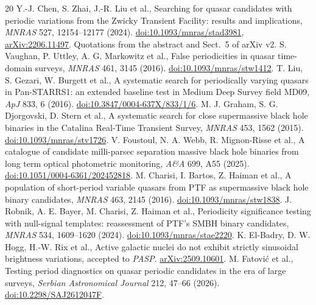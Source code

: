 \documentclass[11pt]{article}
\begin{document}
\begin{thebibliography}{20}
 Y.-J. Chen, S. Zhai, J.-R. Liu et al., Searching for quasar candidates with periodic variations from the Zwicky Transient Facility: results and implications, \emph{MNRAS} 527, 12154--12177 (2024). \href{https://doi.org/10.1093/mnras/stad3981}{doi:10.1093/mnras/stad3981}, \href{https://arxiv.org/abs/2206.11497}{arXiv:2206.11497}. Quotations from the abstract and Sect.~5 of arXiv v2.
 S. Vaughan, P. Uttley, A. G. Markowitz et al., False periodicities in quasar time-domain surveys, \emph{MNRAS} 461, 3145 (2016). \href{https://doi.org/10.1093/mnras/stw1412}{doi:10.1093/mnras/stw1412}.
 T. Liu, S. Gezari, W. Burgett et al., A systematic search for periodically varying quasars in Pan-STARRS1: an extended baseline test in Medium Deep Survey field MD09, \emph{ApJ} 833, 6 (2016). \href{https://doi.org/10.3847/0004-637X/833/1/6}{doi:10.3847/0004-637X/833/1/6}.
 M. J. Graham, S. G. Djorgovski, D. Stern et al., A systematic search for close supermassive black hole binaries in the Catalina Real-Time Transient Survey, \emph{MNRAS} 453, 1562 (2015). \href{https://doi.org/10.1093/mnras/stv1726}{doi:10.1093/mnras/stv1726}.
 V. Foustoul, N. A. Webb, R. Mignon-Risse et al., A catalogue of candidate milli-parsec separation massive black hole binaries from long term optical photometric monitoring, \emph{A\&A} 699, A55 (2025). \href{https://doi.org/10.1051/0004-6361/202452818}{doi:10.1051/0004-6361/202452818}.
 M. Charisi, I. Bartos, Z. Haiman et al., A population of short-period variable quasars from PTF as supermassive black hole binary candidates, \emph{MNRAS} 463, 2145 (2016). \href{https://doi.org/10.1093/mnras/stw1838}{doi:10.1093/mnras/stw1838}.
 J. Robnik, A. E. Bayer, M. Charisi, Z. Haiman et al., Periodicity significance testing with null-signal templates: reassessment of PTF's SMBH binary candidates, \emph{MNRAS} 534, 1609--1620 (2024). \href{https://doi.org/10.1093/mnras/stae2220}{doi:10.1093/mnras/stae2220}.
 K. El-Badry, D. W. Hogg, H.-W. Rix et al., Active galactic nuclei do not exhibit strictly sinusoidal brightness variations, accepted to \emph{PASP}. \href{https://arxiv.org/abs/2509.10601}{arXiv:2509.10601}.
 M. Fatovi\'c et al., Testing period diagnostics on quasar periodic candidates in the era of large surveys, \emph{Serbian Astronomical Journal} 212, 47--66 (2026). \href{https://doi.org/10.2298/SAJ2612047F}{doi:10.2298/SAJ2612047F}.

\end{thebibliography}
\end{document}
